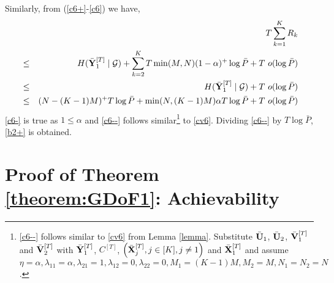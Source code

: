 \documentclass[11pt]{article}
\begin{document}
\begin{enumerate}
 Similarly, from (\eqref{c6+}-\eqref{c6}) we have,
\begin{eqnarray}
&&T\sum_{k=1}^{K}R_k\nonumber\\
&\le& H(\bar{\bf Y}^{[T]}_{1}\mid \mathcal{G})+\sum_{k=2}^{K} T\min(M,N)(1-\alpha)^+\log{\bar{P}}+T~o(\log{\bar{P}})\\
&\le& H(\bar{\bf Y}^{[T]}_{1}\mid \mathcal{G})+T~o(\log{\bar{P}})\label{c6-}\\
&\le& (N-(K-1)M)^+T\log{\bar{P}}+\min(N,(K-1)M)\alpha T\log{\bar{P}}+T~o(\log{\bar{P}})\label{c6--}
 \end{eqnarray}
\eqref{c6-} is true as $1\le\alpha$ and \eqref{c6--} follows similar\footnote{\eqref{c6--} follows similar to  \eqref{cv6}  from Lemma \ref{lemma}. Substitute $\bar{\bf U}_1$, $\bar{\bf U}_2$, $\bar{\bf V}_1^{[T]}$ and $\bar{\bf V}_2^{[T]}$ with $\bar{\bf Y}^{[T]}_{1}$, ${ C}^{[T]}$,  $\left(\bar{\bf X}_{j}^{[T]},j\in[K],j\neq 1\right)$ and $\bar{\bf X}_1^{[T]}$ and  assume $\eta=\alpha, \lambda_{11}=\alpha, \lambda_{21}=1, \lambda_{12}=0, \lambda_{22}=0,M_1=(K-1)M,M_2=M,N_1=N_2=N$.} to  \eqref{cv6}. Dividing \eqref{c6--} by $T\log{\bar{P}}$, \eqref{b2+}  is obtained.



\end{enumerate}

\section{Proof of Theorem \ref{theorem:GDoF1}: Achievability}
\end{document}
